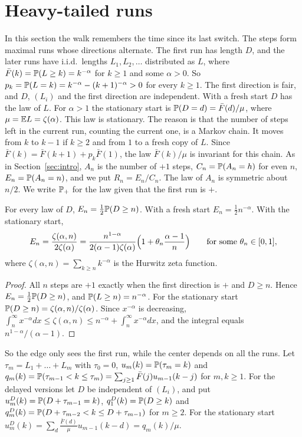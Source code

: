 \section{Heavy-tailed runs}\label{sec:heavy}

In this section the walk remembers the time since its last switch. The steps
form maximal runs whose directions alternate. The first run has length $D$,
and the later runs have i.i.d.\ lengths $L_1,L_2,\dots$ distributed as $L$,
where $\bar F(k)=\mathbb{P}(L\ge k)=k^{-\alpha}$ for $k\ge1$ and some $\alpha>0$.
So $p_k=\mathbb{P}(L=k)=k^{-\alpha}-(k+1)^{-\alpha}>0$ for every $k\ge1$. The first
direction is fair, and $D$, $(L_i)$ and the first direction are independent.
With a fresh start $D$ has the law of $L$. For $\alpha>1$ the stationary start
is $\mathbb{P}(D=d)=\bar F(d)/\mu$, where $\mu=\mathbb{E} L=\zeta(\alpha)$. This law is
stationary. The reason is that the number of steps left in the current run,
counting the current one, is a Markov chain. It moves from $k$ to $k-1$ if
$k\ge2$ and from $1$ to a fresh copy of $L$. Since
$\bar F(k)=\bar F(k+1)+p_k\bar F(1)$, the law $\bar F(k)/\mu$ is invariant
for this chain. As in Section~\ref{sec:intro}, $A_n$ is
the number of $+1$ steps, $C_n=\mathbb{P}(A_n=h)$ for even $n$,
$E_n=\mathbb{P}(A_n=n)$, and we put $R_n=E_n/C_n$. The law of $A_n$ is symmetric
about $n/2$. We write $\mathbb{P}_+$ for the law given that the first run is $+$.

\begin{proposition}\label{prop:edge}
For every law of $D$, $E_n=\frac12\mathbb{P}(D\ge n)$. With a fresh start
$E_n=\frac12n^{-\alpha}$. With the stationary start,
\[
 E_n=\frac{\zeta(\alpha,n)}{2\zeta(\alpha)}
 =\frac{n^{1-\alpha}}{2(\alpha-1)\zeta(\alpha)}
 \Bigl(1+\theta_n\frac{\alpha-1}{n}\Bigr)
 \qquad\text{for some }\theta_n\in[0,1],
\]
where $\zeta(\alpha,n)=\sum_{k\ge n}k^{-\alpha}$ is the Hurwitz zeta
function.
\end{proposition}

\begin{proof}
All $n$ steps are $+1$ exactly when the first direction is $+$ and $D\ge n$.
Hence $E_n=\frac12\mathbb{P}(D\ge n)$, and $\mathbb{P}(L\ge n)=n^{-\alpha}$. For the
stationary start $\mathbb{P}(D\ge n)=\zeta(\alpha,n)/\zeta(\alpha)$. Since
$x^{-\alpha}$ is decreasing,
$\int_n^\infty x^{-\alpha}dx\le\zeta(\alpha,n)\le n^{-\alpha}+\int_n^\infty
x^{-\alpha}dx$, and the integral equals $n^{1-\alpha}/(\alpha-1)$.
\end{proof}

So the edge only sees the first run, while the center depends on all the
runs. Let $\tau_m=L_1+\dots+L_m$ with $\tau_0=0$, $u_m(k)=\mathbb{P}(\tau_m=k)$ and
$q_m(k)=\mathbb{P}(\tau_{m-1}<k\le\tau_m)=\sum_{j\ge1}\bar F(j)u_{m-1}(k-j)$ for
$m,k\ge1$. For the delayed versions let $D$ be independent of $(L_i)$, and
put $u^D_m(k)=\mathbb{P}(D+\tau_{m-1}=k)$, $q^D_1(k)=\mathbb{P}(D\ge k)$ and
$q^D_m(k)=\mathbb{P}(D+\tau_{m-2}<k\le D+\tau_{m-1})$ for $m\ge2$. For the
stationary start $u^D_m(k)=\sum_d\frac{\bar F(d)}{\mu}u_{m-1}(k-d)=q_m(k)/\mu$.

